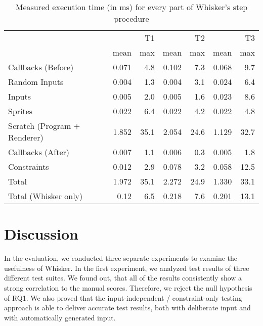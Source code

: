 \begin{table}[htpb]
    \centering
    \footnotesize
    \begin{tabular}{l|rr|rr|rr}
        \toprule
                                     &       & T1   &       & T2   &       & T3   \\
                                     & mean  & max  & mean  & max  & mean  & max  \\
        \midrule
        Callbacks (Before)           & 0.071 & 4.8  & 0.102 & 7.3  & 0.068 & 9.7  \\
        Random Inputs                & 0.004 & 1.3  & 0.004 & 3.1  & 0.024 & 6.4  \\
        Inputs                       & 0.005 & 2.0  & 0.005 & 1.6  & 0.023 & 8.6  \\
        Sprites                      & 0.022 & 6.4  & 0.022 & 4.2  & 0.022 & 4.8  \\
        Scratch (Program + Renderer) & 1.852 & 35.1 & 2.054 & 24.6 & 1.129 & 32.7 \\
        Callbacks (After)            & 0.007 & 1.1  & 0.006 & 0.3  & 0.005 & 1.8  \\
        Constraints                  & 0.012 & 2.9  & 0.078 & 3.2  & 0.058 & 12.5 \\
        \midrule
        Total                        & 1.972 & 35.1 & 2.272 & 24.9 & 1.330 & 33.1 \\
        Total (Whisker only)         & 0.12  & 6.5  & 0.218 & 7.6  & 0.201 & 13.1 \\
        \bottomrule
    \end{tabular}
    \caption{Measured execution time (in ms) for every part of Whisker's step procedure}
    \label{tab:time_measurements}
\end{table}

\section{Discussion}
\label{sec:discussion}

In the evaluation, we conducted three separate experiments to examine the usefulness of Whisker.
In the first experiment, we analyzed test results of three different test suites.
We found out, that all of the results consistently show a strong correlation to the manual scores.
Therefore, we reject the null hypothesis of RQ1.
We also proved that the input-independent / constraint-only testing approach is able to deliver accurate test results,
both with deliberate input and with automatically generated input.
\parspace

